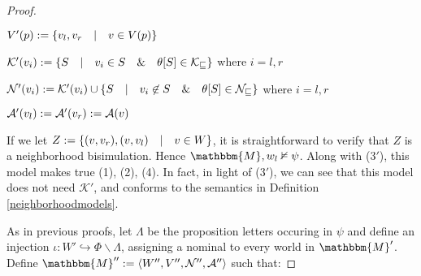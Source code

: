 \begin{proof}
\begin{itemizedot}
    \item $V' (p) := \{v_l, v_r \hspace{1em} | \hspace{1em} v \in V
    (p)\}$
    
    \item $\mathcal{K}' (v_i) := \{S \hspace{1em} | \hspace{1em} v_i \in
    S \hspace{1em} \& \hspace{1em} \theta [S] \in \mathcal{K_v} \}$ where $i =
    l, r$
    
    \item $\mathcal{N}' (v_i) := \mathcal{K}' (v_i) \cup \{S \hspace{1em}
    | \hspace{1em} v_i \not\in S \hspace{1em} \& \hspace{1em} \theta [S] \in
    \mathcal{N_v} \}$ where $i = l, r$
    
    \item $\mathcal{A}' (v_l) := \mathcal{A}' (v_r) := \mathcal{A}
    (v)$
  \end{itemizedot}
  
  
  If we let $Z := \{(v, v_r), (v, v_l) \hspace{1em} | \hspace{1em} v \in
  W\}$, it is straightforward to verify that $Z$ is a neighborhood
  bisimulation.  Hence $\mathbbm{M}, w_l \nvDash \psi$.  Along with (3$'$),
  this model makes true (1), (2), (4).  In fact, in light of ($3'$), we can
  see that this model does not need $\mathcal{K}'$, and conforms to the
  semantics in Definition \ref{neighborhoodmodels}.{\hspace*{\fill}}
  
  
  
  As in previous proofs, let $\Lambda$ be the proposition letters occuring in
  $\psi$ and define an injection $\iota : W' \hookrightarrow \Phi \backslash
  \Lambda$, assigning a nominal to every world in $\mathbbm{M}'$.  Define
  $\mathbbm{M}'' \assign \langle W'', V'', \mathcal{N}'', \mathcal{A}''
  \rangle$ such that:
  
  
  

\end{proof}
